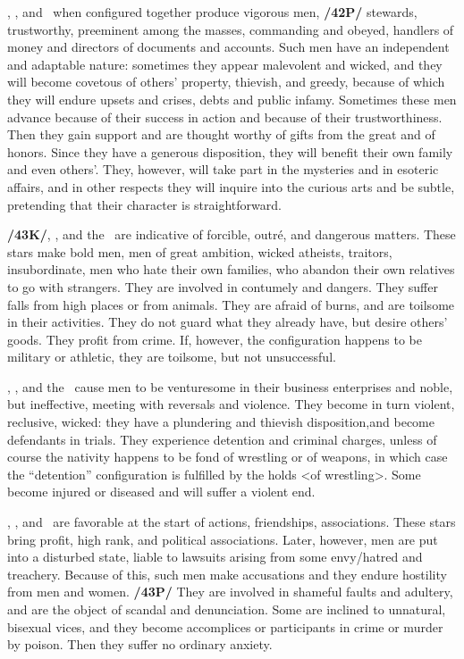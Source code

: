 \Saturn, \Jupiter, and \Mercury\, when configured together produce vigorous men, \textbf{/42P/} stewards,
trustworthy, preeminent among the masses, commanding and obeyed, handlers of money and directors of documents and accounts. Such men have an independent and adaptable nature: sometimes they appear malevolent and wicked, and they will become covetous of others’ property, thievish, and greedy, because of which they will endure upsets and crises, debts and public infamy. Sometimes these men advance because of their success in action and because of their trustworthiness. Then they gain support and are thought worthy of gifts from the great and of honors. Since they have a generous disposition, they will benefit their own family and even others’. They, however, will take part in the mysteries and in esoteric affairs, and in other respects they will inquire into the curious arts and be subtle,  pretending that their character is straightforward.

\textbf{/43K/}\Saturn, \Mars, and the \Sun\, are indicative of forcible, outré, and dangerous matters. These stars make bold men, men of great ambition, wicked atheists, traitors, insubordinate, men who hate their own families, who abandon their own relatives to go with strangers. They are involved in contumely and dangers. They suffer falls from high places or from animals. They are afraid of burns, and are toilsome in their activities. They do not guard what they already have, but desire others’ goods. They profit from
crime. If, however, the configuration happens to be military or athletic, they are toilsome, but not unsuccessful.

\Saturn, \Mars, and the \Moon\, cause men to be venturesome in their business enterprises and noble, but
ineffective, meeting with reversals and violence. They become in turn violent, reclusive, wicked: they have a plundering and thievish disposition,and become defendants in trials. They experience detention and criminal charges, unless of course the nativity happens to be fond of wrestling or of weapons, in which case the “detention” configuration is fulfilled by the holds <of wrestling>. Some become injured or diseased
and will suffer a violent end.

\Saturn, \Mars, and \Venus\, are favorable at the start of actions, friendships, associations. These stars bring profit, high rank, and political associations. Later, however, men are put into a disturbed state, liable to lawsuits arising from some envy/hatred and treachery. Because of this, such men make accusations and they endure hostility from men and women. \textbf{/43P/} They are involved in shameful faults and adultery, and are the object of scandal and denunciation. Some are inclined to unnatural, bisexual vices, and they become accomplices or participants in crime or murder by poison. Then they suffer no ordinary anxiety.

